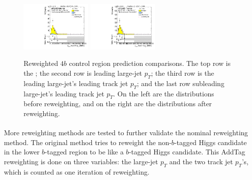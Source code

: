 \begin{figure}[htbp!]
\begin{center}
\includegraphics[width=0.31\textwidth,angle=-90]{figures/boosted/Prereweight/Moriond_FourTag_Control_sublHCand_trk0_Pt.pdf}
\includegraphics[width=0.31\textwidth,angle=-90]{figures/boosted/Control/b77_FourTag_Control_sublHCand_trk0_Pt.pdf}\\
\caption{Reweighted $4b$ control region prediction comparisons. The top row is the \mtwoJ; the second row is leading large-\R jet $p_{T}$; the third row is the leading large-\R jet's leading track jet $p_T$; and the last row subleading large-\R jet's leading track jet $p_T$. On the left are the distributions before reweighting, and on the right are the distributions after reweighting.}
\label{fig:rw-4b-comp-cr}
\end{center}
\end{figure}



\paragraph{}
More reweighting methods are tested to further validate the nominal reweighting method. 
The original method tries to reweight the non-$b$-tagged Higgs candidate in the lower $b$-tagged region to be like a $b$-tagged Higgs candidate. 
This AddTag reweighting is done on three variables: the large-\R jet $p_{T}$ and the two track jet $p_{T}$'s, which is counted as one iteration of reweighting.

